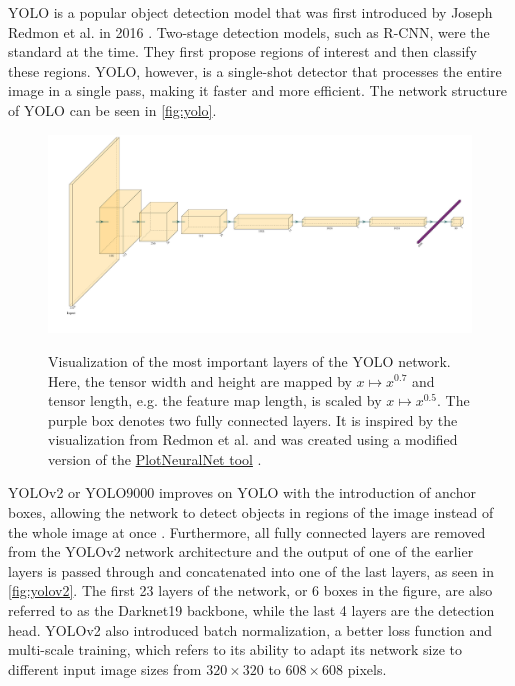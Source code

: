 \documentclass[10pt]{book}
\newcommand{\figureref}[1]{\autoref{#1}}
\begin{document}
\ac{YOLO} is a popular object detection model that was first introduced by Joseph Redmon et al. in 2016 \cite{redmon2016you}. Two-stage detection models, such as R-CNN, were the standard at the time. They first propose regions of interest and then classify these regions. \ac{YOLO}, however, is a single-shot detector that processes the entire image in a single pass, making it faster and more efficient. The network structure of \ac{YOLO} can be seen in \figureref{fig:yolo}.

\begin{figure}
  \caption{Visualization of the most important layers of the \ac{YOLO} network. Here, the tensor width and height are mapped by $x \mapsto x^{0.7}$ and tensor length, e.g. the feature map length, is scaled by $x \mapsto x^{0.5}$. The purple box denotes two fully connected layers. It is inspired by the visualization from Redmon et al. \cite{redmon2016you} and was created using a modified version of the \href{https://github.com/jnccd/PlotNeuralNet}{PlotNeuralNet tool} \cite{haris_iqbal_2018_2526396}.}
  \includegraphics[width=\textwidth]{image/yolo}
  \label{fig:yolo}
\end{figure}

\ac{YOLO}v2 or \ac{YOLO}9000 improves on \ac{YOLO} with the introduction of anchor boxes, allowing the network to detect objects in regions of the image instead of the whole image at once \cite{redmon2017yolo9000}. Furthermore, all fully connected layers are removed from the \ac{YOLO}v2 network architecture and the output of one of the earlier layers is passed through and concatenated into one of the last layers, as seen in \figureref{fig:yolov2}. The first 23 layers of the network, or 6 boxes in the figure, are also referred to as the Darknet19 backbone, while the last 4 layers are the detection head. \ac{YOLO}v2 also introduced batch normalization, a better loss function and multi-scale training, which refers to its ability to adapt its network size to different input image sizes from $320 \times 320$ to $608 \times 608$ pixels.
\end{document}
